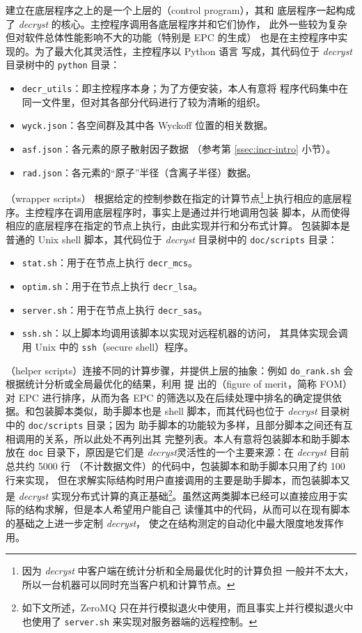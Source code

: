 建立在底层程序之上的是一个上层的（control program），其和
底层程序一起构成了 \emph{decryst} 的核心。主控程序调用各底层程序并和它们协作，
此外一些较为复杂但对软件总体性能影响不大的功能（特别是 EPC 的生成）
也是在主控程序中实现的。为了最大化其灵活性，主控程序以 Python 语言
写成，其代码位于 \emph{decryst} 目录树中的 \verb|python| 目录：
\begin{itemize}
\item \verb|decr_utils|：即主控程序本身；为了方便安装，本人有意将
	程序代码集中在同一文件里，但对其各部分代码进行了较为清晰的组织。
\item \verb|wyck.json|：各空间群及其中各 Wyckoff 位置的相关数据。
\item \verb|asf.json|：各元素的原子散射因子数据
	（参考第 \ref{ssec:incr-intro} 小节）。
\item \verb|rad.json|：各元素的“原子”半径（含离子半径）数据。
\end{itemize}

（wrapper scripts）%
根据给定的控制参数在指定的计算节点\footnote{%
	因为 \emph{decryst} 中客户端在统计分析和全局最优化时的计算负担
	一般并不太大，所以一台机器可以同时充当客户机和计算节点。%
}上执行相应的底层程序。主控程序在调用底层程序时，事实上是通过并行地调用包装
脚本，从而使得相应的底层程序在指定的节点上执行，由此实现并行和分布式计算。
包装脚本是普通的 Unix shell 脚本，其代码位于 \emph{decryst}
目录树中的 \verb|doc/scripts| 目录：
\begin{itemize}
\item \verb|stat.sh|：用于在节点上执行 \verb|decr_mcs|。
\item \verb|optim.sh|：用于在节点上执行 \verb|decr_lsa|。
\item \verb|server.sh|：用于在节点上执行 \verb|decr_sas|。
\item \verb|ssh.sh|：以上脚本均调用该脚本以实现对远程机器的访问，
	其具体实现会调用 Unix 中的 \verb|ssh|（secure shell）程序。
\end{itemize}

（helper scripts）连接不同的计算步骤，并提供上层的抽象：例如
\verb|do_rank.sh| 会根据统计分析或全局最优化的结果，利用 \textcite{deng2011}提
出的（figure of merit，简称 FOM）对 EPC 进行排序，从而为各 EPC
的筛选以及在后续处理中排名的确定提供依据。和包装脚本类似，助手脚本也是 shell
脚本，而其代码也位于 \emph{decryst} 目录树中的 \verb|doc/scripts| 目录；因为
助手脚本的功能较为多样，且部分脚本之间还有互相调用的关系，所以此处不再列出其
完整列表。本人有意将包装脚本和助手脚本放在 \verb|doc| 目录下，原因是它们是
\emph{decryst}灵活性的一个主要来源：在 \emph{decryst} 目前总共约 5000 行
（不计数据文件）的代码中，包装脚本和助手脚本只用了约 100 行来实现，
但在求解实际结构时用户直接调用的主要是助手脚本，而包装脚本又是
\emph{decryst} 实现分布式计算的真正基础\footnote{%
	如下文所述，ZeroMQ 只在并行模拟退火中使用，而且事实上并行模拟退火中
	也使用了 \texttt{server.sh} 来实现对服务器端的远程控制。%
}。虽然这两类脚本已经可以直接应用于实际的结构求解，但是本人希望用户能自己
读懂其中的代码，从而可以在现有脚本的基础之上进一步定制 \emph{decryst}，
使之在结构测定的自动化中最大限度地发挥作用。

